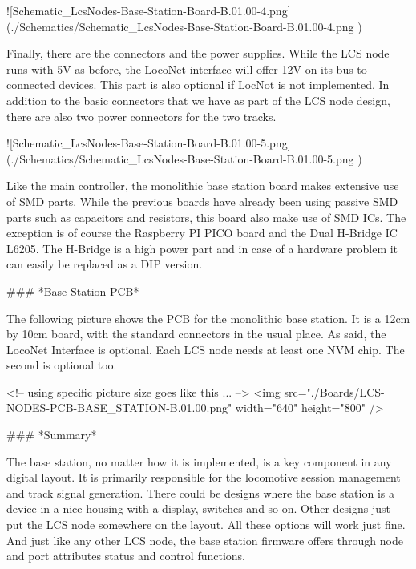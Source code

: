 ![Schematic_LcsNodes-Base-Station-Board-B.01.00-4.png](./Schematics/Schematic_LcsNodes-Base-Station-Board-B.01.00-4.png )

Finally, there are the connectors and the power supplies. While the LCS node runs with 5V as before, the LocoNet interface will offer 12V on its bus to connected devices. This part is also optional if LocNot is not implemented. In addition to the basic connectors that we have as part of the LCS node design, there are also two power connectors for the two tracks.

![Schematic_LcsNodes-Base-Station-Board-B.01.00-5.png](./Schematics/Schematic_LcsNodes-Base-Station-Board-B.01.00-5.png )

Like the main controller, the monolithic base station board makes extensive use of SMD parts. While the previous boards have already been using passive SMD parts such as capacitors and resistors, this board also make use of SMD ICs. The exception is of course the Raspberry PI PICO board and the Dual H-Bridge IC L6205. The H-Bridge is a high power part and in case of a hardware problem it can easily be replaced as a DIP version.

### *Base Station PCB*

The following picture shows the PCB for the monolithic base station. It is a 12cm by 10cm board, with the standard connectors in the usual place. As said, the LocoNet Interface is optional. Each LCS node needs at least one NVM chip. The second is optional too.

<!-- using specific picture size goes like this ... -->
<img src="./Boards/LCS-NODES-PCB-BASE_STATION-B.01.00.png" width="640" height="800" />

### *Summary*

The base station, no matter how it is implemented, is a key component in any digital layout. It is primarily responsible for the locomotive session management and track signal generation. There could be designs where the base station is a device in a nice housing with a display, switches and so on. Other designs just put the LCS node somewhere on the layout. All these options will work just fine. And just like any other LCS node, the base station firmware offers through node and port attributes status and control functions.

